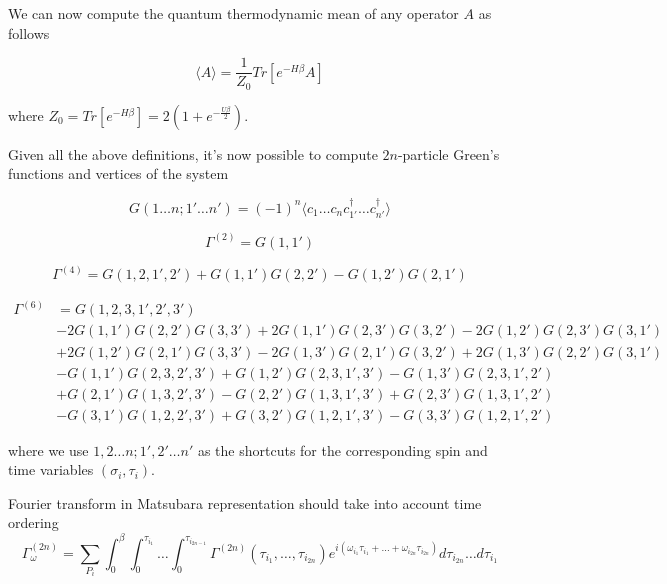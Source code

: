 We can now compute the quantum thermodynamic mean of any operator $A$ as follows

\begin{equation} \langle A\rangle = \frac{1}{Z_0}Tr[e^{-H\beta}A] \end{equation}

where $Z_0 = Tr[e^{-H\beta}] = 2(1+e^{-\frac{U\beta}{2}})$.

Given all the above definitions, it's now possible to compute $2n$-particle Green's functions and vertices of the system

\begin{equation} G(1\dots n;1'\dots n') = (-1)^n \langle c_1\dots c_n c_{1'}^\dagger\dots c_{n'}^\dagger\rangle\end{equation}

\begin{equation} \Gamma^{(2)} = G(1, 1') \end{equation}

\begin{equation} \Gamma^{(4)} = G(1,2,1',2')+G(1,1')G(2,2')-G(1,2')G(2,1') \end{equation}

\begin{equation}\begin{aligned}
\Gamma^{(6)} & = G(1, 2, 3, 1', 2', 3') \\
& -2 G(1, 1') G(2, 2') G(3, 3') 
+2 G(1, 1') G(2, 3') G(3, 2')
-2 G(1, 2') G(2, 3') G(3, 1') \\ 
& +2 G(1, 2') G(2, 1') G(3, 3')
-2 G(1, 3') G(2, 1') G(3, 2')
+2 G(1, 3') G(2, 2') G(3, 1') \\
& -G(1, 1') G(2, 3, 2', 3')
+G(1, 2') G(2, 3, 1', 3')
-G(1, 3') G(2, 3, 1', 2') \\
& +G(2, 1') G(1, 3, 2', 3')
-G(2, 2') G(1, 3, 1', 3')
+G(2, 3') G(1, 3, 1', 2') \\
& -G(3, 1') G(1, 2, 2', 3')
+G(3, 2') G(1, 2, 1', 3')
-G(3, 3') G(1, 2, 1', 2')
\end{aligned}\end{equation}

where we use $1,2\dots n;1',2'\dots n'$ as the shortcuts for the corresponding spin and time variables $(\sigma_i,\tau_i)$.

Fourier transform in Matsubara representation should take into account time ordering
\begin{equation}
  \Gamma_\omega^{(2n)} = \sum_{P_i} \int_0^\beta\int_0^{\tau_{i_1}}\dots\int_0^{\tau_{i_{2n-1}}}\Gamma^{(2n)}(\tau_{i_1},\dots,\tau_{i_{2n}})
  e^{i(\omega_{i_1}\tau_{i_1}+\dots+\omega_{i_{2n}}\tau_{i_{2n}})}d\tau_{i_{2n}}\dots d\tau_{i_1}
\end{equation}

